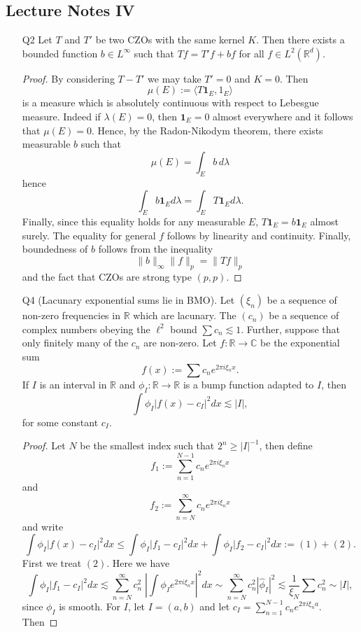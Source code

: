 \documentclass[11pt]{article}
\theoremstyle{remark}
\newcommand{\1}{\textbf{1}}
\newcommand{\lle}{\lesssim}
\def\norm#1{\| #1  \|}
\newcommand{\bbR}{\mathbb{R}}
\newcommand{\bbC}{\mathbb{C}}
\begin{document}
\subsection*{Lecture Notes IV}
\begin{enumerate}
\item[Q2] Let $T$ and $T'$ be two CZOs with the same kernel $K$. Then there exists a bounded function $b \in L^\infty$ such that $Tf = T'f + bf$ for all $f \in L^2(\bbR^d)$.
\begin{proof}
By considering $T - T'$ we may take $T' = 0$ and $K = 0$. Then
\[
\mu(E) := \langle T\1_E, 1_E \rangle
\]
is a measure which is absolutely continuous with respect to Lebesgue measure. Indeed if $\lambda(E) = 0$, then $\1_E = 0$ almost everywhere and it follows that $\mu(E) = 0$. Hence, by the Radon-Nikodym theorem, there exists measurable $b$ such that
\[
\mu(E) = \int_E b \,d\lambda
\]
hence
\[
\int_E b \1_E d\lambda = \int_E T\1_E d\lambda.
\]
Finally, since this equality holds for any measurable $E$, $T \1_E = b\1_E$ almost surely. The equality for general $f$ follows by linearity and continuity. Finally, boundedness of $b$ follows from the inequality
\[
\norm{b}_\infty \norm{f}_p = \norm{T f}_p
\]
and the fact that CZOs are strong type $(p,p)$.
\end{proof}
\item[Q4](Lacunary exponential sums lie in BMO). Let $(\xi_n)$ be a sequence of non-zero frequencies in $\bbR$ which are lacunary. The $(c_n)$ be a sequence of complex numbers obeying the $\ell^2$ bound $\sum c_n \lle 1$. Further, suppose that only finitely many of the $c_n$ are non-zero. Let $f: \bbR \to \bbC$ be the exponential sum
\[
f(x) := \sum c_n e^{2 \pi i \xi_n x}.
\]
If $I$ is an interval in $\bbR$ and $\phi_I: \bbR \to \bbR$ is a bump function adapted to $I$, then
\[
\int \phi_I|f(x) - c_I|^2 dx \lle |I|,
\]
for some constant $c_I$.
\begin{proof}
Let $N$ be the smallest index such that $2^n \geq |I|^{-1}$, then define
\[
f_1:= \sum_{n =1}^{N-1} c_n e^{2 \pi i \xi_n x}
\]
and
\[
f_2:=\sum_{n=N}^\infty c_n e^{2 \pi i \xi_n x}
\]
and write
\[
\int \phi_I|f(x) - c_I|^2 dx \leq \int \phi_I|f_1 - c_I|^2 dx  + \int \phi_I|f_2 - c_I|^2 dx := (1) + (2).
\]
First we treat $(2)$. Here we have
\[
\int \phi_I|f_1 - c_I|^2 dx \lle \sum_{n=N}^\infty  c_n^2 \;|\int \phi_I e^{2 \pi i \xi_n x}|^2 dx \sim \sum_{n=N}^\infty  c_n^2 |\hat{\phi}_I|^2 \lle \frac{1}{\xi_{N}} \sum c_n^2 \sim|I|,
\]
since $\phi_I$ is smooth. For $I$, let $I = (a,b)$ and let $c_I = \sum_{n =1}^{N-1} c_n e^{2 \pi i \xi_n a}$. Then

\end{proof}
\end{enumerate}
\end{document}
